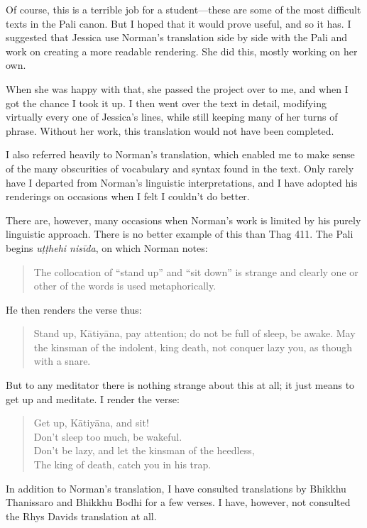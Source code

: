 \documentclass[10pt, openany]{book}
\begin{document}
Of course, this is a terrible job for a student—these are some of the most difficult texts in the Pali canon. But I hoped that it would prove useful, and so it has. I suggested that Jessica use Norman’s translation side by side with the Pali and work on creating a more readable rendering. She did this, mostly working on her own.

When she was happy with that, she passed the project over to me, and when I got the chance I took it up. I then went over the text in detail, modifying virtually every one of Jessica’s lines, while still keeping many of her turns of phrase. Without her work, this translation would not have been completed.

I also referred heavily to Norman’s translation, which enabled me to make sense of the many obscurities of vocabulary and syntax found in the text. Only rarely have I departed from Norman’s linguistic interpretations, and I have adopted his renderings on occasions when I felt I couldn’t do better.

There are, however, many occasions when Norman’s work is limited by his purely linguistic approach. There is no better example of this than Thag 411. The Pali begins \emph{uṭṭhehi nisīda}, on which Norman notes:

\begin{quote}The collocation of “stand up” and “sit down” is strange and clearly one or other of the words is used metaphorically.\end{quote}

He then renders the verse thus:

\begin{quote}Stand up, Kātiyāna, pay attention; do not be full of sleep, be awake. May the kinsman of the indolent, king death, not conquer lazy you, as though with a snare.\end{quote}

But to any meditator there is nothing strange about this at all; it just means to get up and meditate. I render the verse:

\begin{quote}Get up, Kātiyāna, and sit!\\
Don’t sleep too much, be wakeful.\\
Don’t be lazy, and let the kinsman of the heedless,\\
The king of death, catch you in his trap.\end{quote}

In addition to Norman’s translation, I have consulted translations by Bhikkhu Thanissaro and Bhik\-khu Bodhi for a few verses. I have, however, not consulted the Rhys Davids translation at all.
\end{document}
